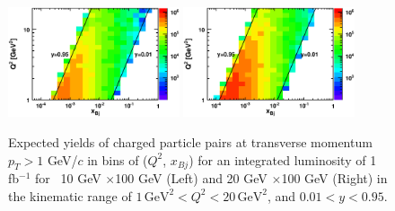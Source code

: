 \begin{figure} 
\begin{center}
\includegraphics[width=0.45\textwidth]
{plots/chpt6/q2vx_paircount_10x100_1fb-1.eps}
\includegraphics[width=0.45\textwidth]
{plots/chpt6/q2vx_paircount_20x100_1fb-1.eps}
\end{center} 
\caption[Statistics in allowed kinematics region]{Expected yields of charged
particle pairs at transverse momentum $p_{T}>1$ GeV/$c$ in bins of 
($Q^{2}$, $x_{Bj}$) for an integrated luminosity of 1 fb$^{-1}$ for 
\ep\ 10 GeV $\times$100 GeV (Left) and 20 GeV $\times$100 GeV (Right) in the kinematic
range of $1\, \textrm{GeV}^{2}<Q^{2}<20 \, \textrm{GeV}^{2}$, and $0.01<y<0.95$.}
\label{fig:Q2VsxBj}
\end{figure}

